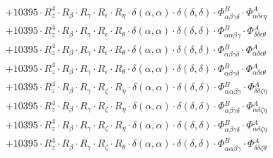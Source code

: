 \documentclass{article}
\begin{document}
\begin{subequations}
\begin{gather}
\begin{array}{c}
 \\[0.2em] 		 + 10395 \cdot R_{z}^{4} \cdot R_{\beta{}} \cdot R_{\gamma{}} \cdot R_{\epsilon{}} \cdot R_{\eta{}} \cdot \delta{}\left(\alpha{}, \alpha{}\right) \cdot \delta{}\left(\delta{}, \delta{}\right) \cdot \Phi{}^{B}_{\alpha{}\beta{}\gamma{}\delta{}} \cdot \Phi{}^{A}_{\alpha{}\delta{}\epsilon{}\eta{}} 
 \\[0.2em] 		 + 10395 \cdot R_{z}^{4} \cdot R_{\beta{}} \cdot R_{\gamma{}} \cdot R_{\epsilon{}} \cdot R_{\theta{}} \cdot \delta{}\left(\alpha{}, \alpha{}\right) \cdot \delta{}\left(\delta{}, \delta{}\right) \cdot \Phi{}^{B}_{\alpha{}\alpha{}\beta{}\gamma{}} \cdot \Phi{}^{A}_{\delta{}\delta{}\epsilon{}\theta{}} 
 \\[0.2em] 		 + 10395 \cdot R_{z}^{4} \cdot R_{\beta{}} \cdot R_{\gamma{}} \cdot R_{\epsilon{}} \cdot R_{\theta{}} \cdot \delta{}\left(\alpha{}, \alpha{}\right) \cdot \delta{}\left(\delta{}, \delta{}\right) \cdot \Phi{}^{B}_{\alpha{}\beta{}\gamma{}\delta{}} \cdot \Phi{}^{A}_{\alpha{}\delta{}\epsilon{}\theta{}} 
 \\[0.2em] 		 + 10395 \cdot R_{z}^{4} \cdot R_{\beta{}} \cdot R_{\gamma{}} \cdot R_{\epsilon{}} \cdot R_{\theta{}} \cdot \delta{}\left(\alpha{}, \alpha{}\right) \cdot \delta{}\left(\delta{}, \delta{}\right) \cdot \Phi{}^{B}_{\alpha{}\beta{}\gamma{}\delta{}} \cdot \Phi{}^{A}_{\alpha{}\delta{}\epsilon{}\theta{}} 
 \\[0.2em] 		 + 10395 \cdot R_{z}^{4} \cdot R_{\beta{}} \cdot R_{\gamma{}} \cdot R_{\zeta{}} \cdot R_{\eta{}} \cdot \delta{}\left(\alpha{}, \alpha{}\right) \cdot \delta{}\left(\delta{}, \delta{}\right) \cdot \Phi{}^{B}_{\alpha{}\alpha{}\beta{}\gamma{}} \cdot \Phi{}^{A}_{\delta{}\delta{}\zeta{}\eta{}} 
 \\[0.2em] 		 + 10395 \cdot R_{z}^{4} \cdot R_{\beta{}} \cdot R_{\gamma{}} \cdot R_{\zeta{}} \cdot R_{\eta{}} \cdot \delta{}\left(\alpha{}, \alpha{}\right) \cdot \delta{}\left(\delta{}, \delta{}\right) \cdot \Phi{}^{B}_{\alpha{}\beta{}\gamma{}\delta{}} \cdot \Phi{}^{A}_{\alpha{}\delta{}\zeta{}\eta{}} 
 \\[0.2em] 		 + 10395 \cdot R_{z}^{4} \cdot R_{\beta{}} \cdot R_{\gamma{}} \cdot R_{\zeta{}} \cdot R_{\eta{}} \cdot \delta{}\left(\alpha{}, \alpha{}\right) \cdot \delta{}\left(\delta{}, \delta{}\right) \cdot \Phi{}^{B}_{\alpha{}\beta{}\gamma{}\delta{}} \cdot \Phi{}^{A}_{\alpha{}\delta{}\zeta{}\eta{}} 
 \\[0.2em] 		 + 10395 \cdot R_{z}^{4} \cdot R_{\beta{}} \cdot R_{\gamma{}} \cdot R_{\zeta{}} \cdot R_{\theta{}} \cdot \delta{}\left(\alpha{}, \alpha{}\right) \cdot \delta{}\left(\delta{}, \delta{}\right) \cdot \Phi{}^{B}_{\alpha{}\alpha{}\beta{}\gamma{}} \cdot \Phi{}^{A}_{\delta{}\delta{}\zeta{}\theta{}} 

\end{array}
\end{gather}
\end{subequations}
\end{document}

